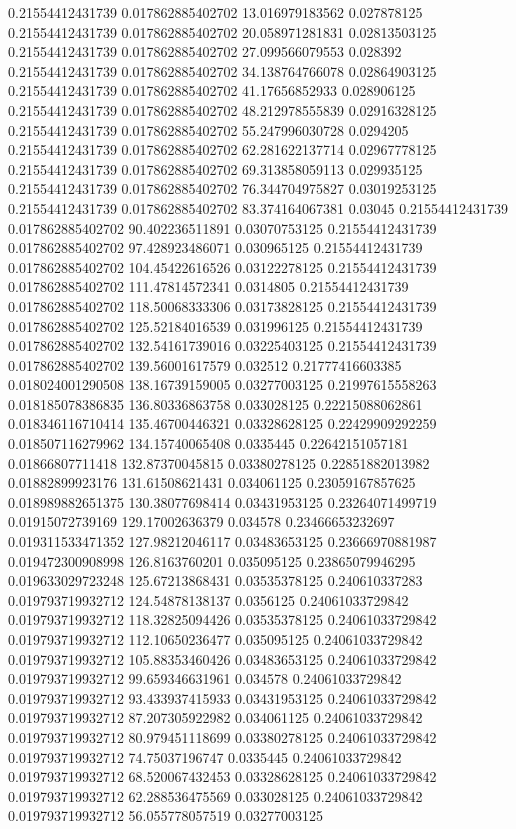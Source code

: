 0.21554412431739 0.017862885402702 13.016979183562 0.027878125
0.21554412431739 0.017862885402702 20.058971281831 0.02813503125
0.21554412431739 0.017862885402702 27.099566079553 0.028392
0.21554412431739 0.017862885402702 34.138764766078 0.02864903125
0.21554412431739 0.017862885402702 41.17656852933 0.028906125
0.21554412431739 0.017862885402702 48.212978555839 0.02916328125
0.21554412431739 0.017862885402702 55.247996030728 0.0294205
0.21554412431739 0.017862885402702 62.281622137714 0.02967778125
0.21554412431739 0.017862885402702 69.313858059113 0.029935125
0.21554412431739 0.017862885402702 76.344704975827 0.03019253125
0.21554412431739 0.017862885402702 83.374164067381 0.03045
0.21554412431739 0.017862885402702 90.402236511891 0.03070753125
0.21554412431739 0.017862885402702 97.428923486071 0.030965125
0.21554412431739 0.017862885402702 104.45422616526 0.03122278125
0.21554412431739 0.017862885402702 111.47814572341 0.0314805
0.21554412431739 0.017862885402702 118.50068333306 0.03173828125
0.21554412431739 0.017862885402702 125.52184016539 0.031996125
0.21554412431739 0.017862885402702 132.54161739016 0.03225403125
0.21554412431739 0.017862885402702 139.56001617579 0.032512
0.21777416603385 0.018024001290508 138.16739159005 0.03277003125
0.21997615558263 0.018185078386835 136.80336863758 0.033028125
0.22215088062861 0.018346116710414 135.46700446321 0.03328628125
0.22429909292259 0.018507116279962 134.15740065408 0.0335445
0.22642151057181 0.01866807711418 132.87370045815 0.03380278125
0.22851882013982 0.01882899923176 131.61508621431 0.034061125
0.23059167857625 0.018989882651375 130.38077698414 0.03431953125
0.23264071499719 0.01915072739169 129.17002636379 0.034578
0.23466653232697 0.019311533471352 127.98212046117 0.03483653125
0.23666970881987 0.019472300908998 126.8163760201 0.035095125
0.23865079946295 0.019633029723248 125.67213868431 0.03535378125
0.240610337283 0.019793719932712 124.54878138137 0.0356125
0.24061033729842 0.019793719932712 118.32825094426 0.03535378125
0.24061033729842 0.019793719932712 112.10650236477 0.035095125
0.24061033729842 0.019793719932712 105.88353460426 0.03483653125
0.24061033729842 0.019793719932712 99.659346631961 0.034578
0.24061033729842 0.019793719932712 93.433937415933 0.03431953125
0.24061033729842 0.019793719932712 87.207305922982 0.034061125
0.24061033729842 0.019793719932712 80.979451118699 0.03380278125
0.24061033729842 0.019793719932712 74.75037196747 0.0335445
0.24061033729842 0.019793719932712 68.520067432453 0.03328628125
0.24061033729842 0.019793719932712 62.288536475569 0.033028125
0.24061033729842 0.019793719932712 56.055778057519 0.03277003125

